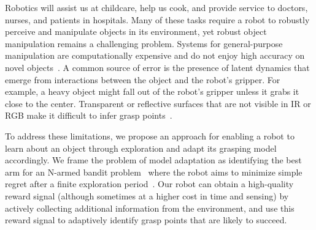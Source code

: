 \documentclass{article}
\begin{document}
Robotics will assist us at childcare, help us cook, and provide
service to doctors, nurses, and patients in hospitals. Many of these
tasks require a robot to robustly perceive and manipulate objects in
its environment, yet robust object manipulation remains a challenging
problem.  Systems for general-purpose manipulation are computationally
expensive and do not enjoy high accuracy on novel
objects~\citep{saxena08}.  A common source of error is the presence of
latent dynamics that emerge from interactions between the object and
the robot's gripper.  For example, a heavy object might fall out of
the robot's gripper unless it grabs it close to the center.
Transparent or reflective surfaces that are not visible in IR or RGB
make it difficult to infer grasp points~\citep{lysenkov13}.

To address these limitations, we propose an approach for enabling a
robot to learn about an object through exploration and adapt its
grasping model accordingly.  We frame the problem of model adaptation
as identifying the best arm for an N-armed bandit
problem~\citep{thompson33} where the robot aims to minimize simple
regret after a finite exploration period~\citep{bubeck09}.  Our robot
can obtain a high-quality reward signal (although sometimes at a
higher cost in time and sensing) by actively collecting additional
information from the environment, and use this reward signal to
adaptively identify grasp points that are likely to succeed.  
\end{document}
